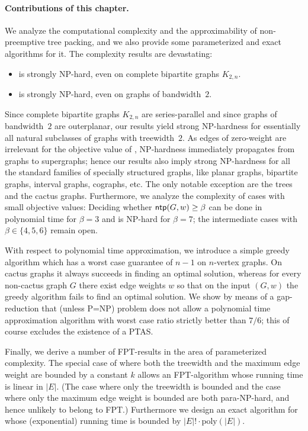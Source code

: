 \paragraph{Contributions of this chapter.}
We analyze the computational complexity and the approximability of non-preemptive 
tree packing, and we also provide some parameterized and exact algorithms for it.
The complexity results are devastating:
\begin{itemize}
\item {\xxxNTP} is strongly NP-hard, even on complete bipartite graphs $K_{2,n}$. 
\item {\xxxNTP} is strongly NP-hard, even on graphs of bandwidth~$2$.
\end{itemize}
Since complete bipartite graphs $K_{2,n}$ are series-parallel and since graphs of 
bandwidth~$2$ are outerplanar, our results yield strong NP-hardness for essentially 
all natural subclasses of graphs with treewidth~$2$.
As edges of zero-weight are irrelevant for the objective value of {\xxxNTP}, NP-hardness 
immediately propagates from graphs to supergraphs; hence our results also imply 
strong NP-hardness for all the standard families of specially structured graphs, 
like planar graphs, bipartite graphs, interval graphs, cographs, etc.
The only notable exception are the trees and the cactus graphs.
Furthermore, we analyze the complexity of cases with small objective values:
Deciding whether $\operatorname{\textsf{ntp}}(G,w)\ge\beta$ can be done in polynomial time for $\beta=3$
and is NP-hard for $\beta=7$; the intermediate cases with $\beta\in\{4,5,6\}$ remain open.

With respect to polynomial time approximation, we introduce a simple greedy algorithm
which has a worst case guarantee of $n-1$ on $n$-vertex graphs.
On cactus graphs it always succeeds in finding an optimal solution, whereas for every 
non-cactus graph $G$ there exist edge weights $w$ so that on the input $(G,w)$ the 
greedy algorithm fails to find an optimal solution.
We show by means of a gap-reduction that (unless P=NP) problem {\xxxNTP} does not
allow a polynomial time approximation algorithm with worst case ratio strictly better
than $7/6$; this of course excludes the existence of a PTAS.

Finally, we derive a number of FPT-results in the area of parameterized complexity.
The special case of {\xxxNTP} where both the treewidth and the maximum edge weight are 
bounded by a constant $k$ allows an FPT-algorithm whose running time is linear in $|E|$.
(The case where only the treewidth is bounded and the case where only the maximum 
edge weight is bounded are both para-NP-hard, and hence unlikely to belong to FPT.)
Furthermore we design an exact algorithm for {\xxxNTP} whose (exponential) 
running time is bounded by $|E|!\cdot\text{poly}(|E|)$.

